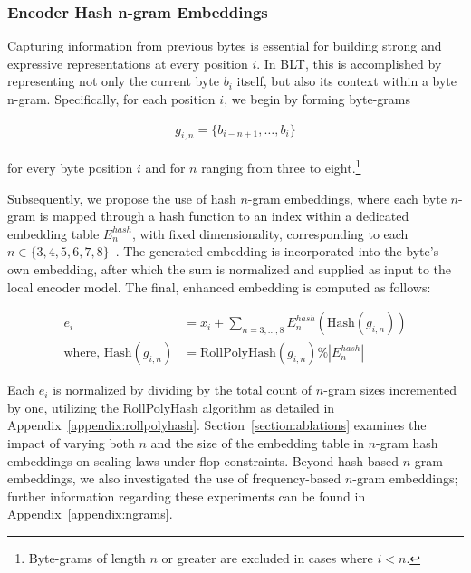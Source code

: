 \subsubsection{Encoder Hash n-gram Embeddings}
\label{sec:ngram-emb}
\label{sec:hash-emb}
Capturing information from previous bytes is essential for building strong and expressive representations at every position $i$. In {\textsc BLT}, this is accomplished by representing not only the current byte $b_i$ itself, but also its context within a byte n-gram. Specifically, for each position $i$, we begin by forming byte-grams

\begin{align}
    g_{i,n}=\{b_{i-n + 1},\ldots, b_i\}
\end{align}

for every byte position $i$ and for $n$ ranging from three to eight.\footnote{
Byte-grams of length $n$ or greater are excluded in cases where $i<n$. }

Subsequently, we propose the use of hash $n$-gram embeddings, where each byte $n$-gram is mapped through a hash function to an index within a dedicated embedding table $E_{n}^{hash}$, with fixed dimensionality, corresponding to each $n \in \{3,4,5,6,7,8\}$~\citep{bai2010learning}.
The generated embedding is incorporated into the byte’s own embedding, after which the sum is normalized and supplied as input to the local encoder model. The final, enhanced embedding is computed as follows:

\begin{align}
e_i &= x_i + \sum_{n = 3,...,8}E_{n}^{hash}(\text{Hash}(g_{i,n})) \\
\text{where, Hash}(g_{i,n}) &= \text{RollPolyHash}(g_{i,n}) \% |E_{n}^{hash}|
\end{align}

Each $e_i$ is normalized by dividing by the total count of $n$-gram sizes incremented by one, utilizing the RollPolyHash algorithm as detailed in Appendix~\ref{appendix:rollpolyhash}. Section~\ref{section:ablations} examines the impact of varying both $n$ and the size of the embedding table in $n$-gram hash embeddings on scaling laws under flop constraints. Beyond hash-based $n$-gram embeddings, we also investigated the use of frequency-based $n$-gram embeddings; further information regarding these experiments can be found in Appendix~\ref{appendix:ngrams}.

